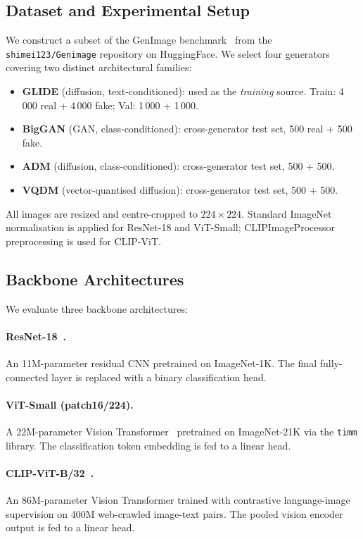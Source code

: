 \documentclass{article}
\begin{document}
\subsection{Dataset and Experimental Setup}

We construct a subset of the GenImage benchmark~\cite{zhu2023genimage} from the \texttt{shimei123/Genimage} repository on HuggingFace.
We select four generators covering two distinct architectural families:

\begin{itemize}
    \item \textbf{GLIDE} (diffusion, text-conditioned): used as the \emph{training} source. Train: 4\,000 real + 4\,000 fake; Val: 1\,000 + 1\,000.
    \item \textbf{BigGAN} (GAN, class-conditioned): cross-generator test set, 500 real + 500 fake.
    \item \textbf{ADM} (diffusion, class-conditioned): cross-generator test set, 500 + 500.
    \item \textbf{VQDM} (vector-quantised diffusion): cross-generator test set, 500 + 500.
\end{itemize}

All images are resized and centre-cropped to $224 \times 224$.
Standard ImageNet normalisation is applied for ResNet-18 and ViT-Small; CLIPImageProcessor preprocessing is used for CLIP-ViT.

\subsection{Backbone Architectures}

We evaluate three backbone architectures:

\paragraph{ResNet-18~\cite{he2016deep}.}
An 11M-parameter residual CNN pretrained on ImageNet-1K.
The final fully-connected layer is replaced with a binary classification head.

\paragraph{ViT-Small (patch16/224).}
A 22M-parameter Vision Transformer~\cite{dosovitskiy2021vit} pretrained on ImageNet-21K via the \texttt{timm} library.
The classification token embedding is fed to a linear head.

\paragraph{CLIP-ViT-B/32~\cite{radford2021clip}.}
An 86M-parameter Vision Transformer trained with contrastive language-image supervision on 400M web-crawled image-text pairs.
The pooled vision encoder output is fed to a linear head.
\end{document}
